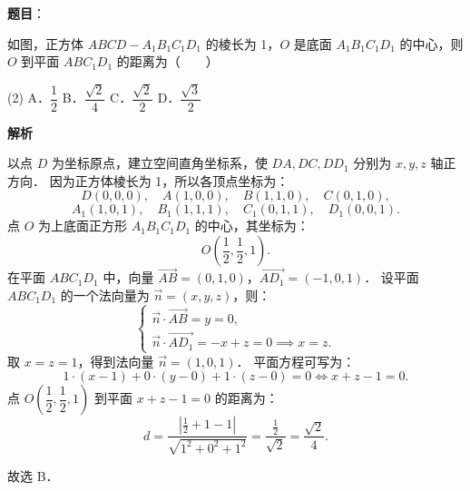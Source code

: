 \begin{answer}

\textbf{题目}：

如图，正方体 $ABCD - A_1B_1C_1D_1$ 的棱长为 1，$O$ 是底面 $A_1B_1C_1D_1$ 的中心，则 $O$ 到平面 $ABC_1D_1$ 的距离为\mbox{（　　）}
\nopagebreak[4]
\begin{center}\end{center}
\nopagebreak[4]
\begin{gkopts}(2)
\task A．$\dfrac{1}{2}$
\task B．$\dfrac{\sqrt{2}}{4}$
\task C．$\dfrac{\sqrt{2}}{2}$
\task D．$\dfrac{\sqrt{3}}{2}$
\end{gkopts}

\textbf{解析}

以点 $D$ 为坐标原点，建立空间直角坐标系，使 $DA, DC, DD_1$ 分别为 $x, y, z$ 轴正方向．
因为正方体棱长为 1，所以各顶点坐标为：
\nopagebreak[4]
\[
D(0, 0, 0), \quad A(1, 0, 0), \quad B(1, 1, 0), \quad C(0, 1, 0),
\]
\nopagebreak[4]
\[
A_1(1, 0, 1), \quad B_1(1, 1, 1), \quad C_1(0, 1, 1), \quad D_1(0, 0, 1).
\]
点 $O$ 为上底面正方形 $A_1B_1C_1D_1$ 的中心，其坐标为：
\nopagebreak[4]
\[
O\left(\frac{1}{2}, \frac{1}{2}, 1\right).
\]
在平面 $ABC_1D_1$ 中，向量 $\vec{AB} = (0, 1, 0)$，$\vec{AD_1} = (-1, 0, 1)$．
设平面 $ABC_1D_1$ 的一个法向量为 $\vec{n} = (x, y, z)$，则：
\nopagebreak[4]
\[
\begin{cases}
\vec{n} \cdot \vec{AB} = y = 0, \\
\vec{n} \cdot \vec{AD_1} = -x + z = 0 \implies x = z.
\end{cases}
\]
取 $x = z = 1$，得到法向量 $\vec{n} = (1, 0, 1)$．
平面方程可写为：
\nopagebreak[4]
\[
1 \cdot (x - 1) + 0 \cdot (y - 0) + 1 \cdot (z - 0) = 0 \iff x + z - 1 = 0.
\]
点 $O\left(\dfrac{1}{2}, \dfrac{1}{2}, 1\right)$ 到平面 $x + z - 1 = 0$ 的距离为：
\nopagebreak[4]
\[
d = \frac{\left|\frac{1}{2} + 1 - 1\right|}{\sqrt{1^2 + 0^2 + 1^2}} = \frac{\frac{1}{2}}{\sqrt{2}} = \frac{\sqrt{2}}{4}.
\]

故选 B．


\end{answer}
